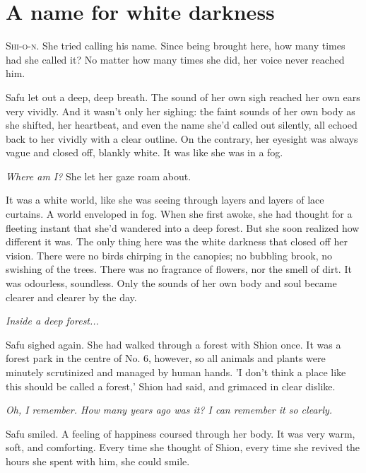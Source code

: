 
\chapter{A name for white darkness}


\lettrine{S}{hi-o-n}. She tried calling his name. Since being brought here, how many
times had she called it? No matter how many times she did, her voice
never reached him.~

Safu let out a deep, deep breath. The sound of her own sigh reached her
own ears very vividly. And it wasn't only her sighing: the faint sounds
of her own body as she shifted, her heartbeat, and even the name she'd
called out silently, all echoed back to her vividly with a clear
outline. On the contrary, her eyesight was always vague and closed off,
blankly white. It was like she was in a fog.

\emph{Where am I?} She let her gaze roam about.

It was a white world, like she was seeing through layers and layers of
lace curtains. A world enveloped in fog. When she first awoke, she had
thought for a fleeting instant that she'd wandered into a deep forest.
But she soon realized how different it was. The only thing here was the
white darkness that closed off her vision. There were no birds chirping
in the canopies; no bubbling brook, no swishing of the trees. There was
no fragrance of flowers, nor the smell of dirt. It was odourless,
soundless. Only the sounds of her own body and soul became clearer and
clearer by the day.

\emph{Inside a deep forest...}

Safu sighed again. She had walked through a forest with Shion once. It
was a forest park in the centre of No. 6, however, so all animals and
plants were minutely scrutinized and managed by human hands. 'I don't
think a place like this should be called a forest,' Shion had said, and
grimaced in clear dislike.

\emph{Oh, I remember. How many years ago was it? I can remember it so clearly.}

Safu smiled. A feeling of happiness coursed through her body. It was
very warm, soft, and comforting. Every time she thought of Shion, every
time she revived the hours she spent with him, she could smile.

